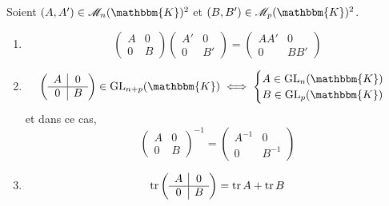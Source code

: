 \begin{prop}
	Soient $(A,A') \in \mathcal{M}_n(\mathbbm{K})^2$ et $(B,B') \in \mathcal{M}_p(\mathbbm{K})^2$.
	\begin{enumerate}
		\item \[
				\left(\begin{array}{c|c}
					A&0\\ \hline
					0&B
				\end{array}\right)
				\left(\begin{array}{c|c}
					A'&0\\ \hline
					0&B'
				\end{array}\right) = 
				\left(\begin{array}{c|c}
					AA'&0\\ \hline
					0&BB'
				\end{array}\right)
			\]
		\item \[
				\left(\begin{array}{c|c}
					A&0\\ \hline
					0&B
				\end{array}\right) \in \mathrm{GL}_{n+p}(\mathbbm{K})	 \iff \begin{cases}
					 A \in \mathrm{GL}_n(\mathbbm{K})\\
					 B \in \mathrm{GL}_p(\mathbbm{K})
				\end{cases}
			\] et dans ce cas, \[
				\left(\begin{array}{c|c}
					A&0\\ \hline
					0&B
				\end{array}\right)^{-1} =
				\left(\begin{array}{c|c}
					A^{-1}&0\\ \hline
					0&B^{-1}
				\end{array}\right)
			\]
		\item \[
				\operatorname{tr} \left(\begin{array}{c|c}
					A&0\\ \hline
					0&B
				\end{array}\right) = \operatorname{tr} A + \operatorname{tr} B
			\]
	\end{enumerate}
\end{prop}

